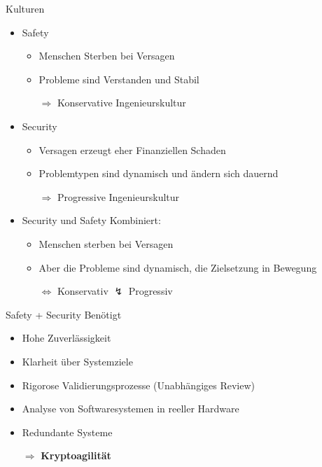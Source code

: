 \begin{frame}[T]{Kulturen}
  \begin{itemize}
    \item Safety
    \begin{itemize}
      \item Menschen Sterben bei Versagen
      \item Probleme sind Verstanden und Stabil
      \item[$\Rightarrow$] Konservative Ingenieurskultur
    \end{itemize}

    \item Security
    \begin{itemize}
      \item Versagen erzeugt eher Finanziellen Schaden
      \item Problemtypen sind dynamisch und ändern sich dauernd
      \item[$\Rightarrow$] Progressive Ingenieurskultur
    \end{itemize}

    \item Security und Safety Kombiniert:
    \begin{itemize}
      \item Menschen sterben bei Versagen
      \item Aber die Probleme sind dynamisch, die Zielsetzung in Bewegung
      \item[$\Leftrightarrow$] Konservativ $\lightning$ Progressiv
    \end{itemize}
  \end{itemize}
\end{frame}

\begin{frame}[T]{Safety + Security Benötigt}
  \begin{itemize}
    \item Hohe Zuverlässigkeit
    \item Klarheit über Systemziele
    \item Rigorose Validierungsprozesse (Unabhängiges Review)
    \item Analyse von Softwaresystemen in reeller Hardware
    \item Redundante Systeme
    \item[$\Rightarrow$] \textbf{Kryptoagilität}
  \end{itemize}
\end{frame}
